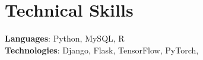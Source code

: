 \section{Technical Skills}
    \begin{itemize}[leftmargin=0.15in, label={}]
	\small{\item{
		\textbf{Languages}{: Python, MySQL, R} \\
		\textbf{Technologies}{: Django, Flask, TensorFlow, PyTorch,} \\
	}}
    \end{itemize}